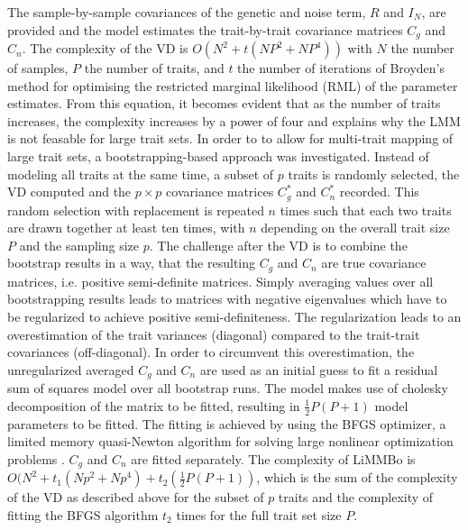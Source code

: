 The sample-by-sample covariances of the genetic and noise term, \(R\) and \(I_N\), are provided and the model estimates the trait-by-trait covariance matrices \(C_g\) and \(C_n\). The complexity of the VD is \(O(N^2 + t(NP^2 + NP^4))\) with \(N\) the number of samples, \(P\) the number of traits, and \(t\) the number of iterations of Broyden's method for optimising the restricted marginal likelihood (RML) of the parameter estimates. From this equation, it becomes evident that as the number of traits increases, the complexity increases by a power of four and explains why the LMM is not feasable for large trait sets. In order to to allow for multi-trait mapping of large trait sets, a bootstrapping-based approach was investigated. Instead of modeling all traits at the same time, a subset of \(p\) traits is randomly selected, the VD computed  and the $p \times p$ covariance matrices $C^*_g$ and $C^*_n$ recorded. This random selection with replacement is repeated \(n\) times such that each two traits are drawn together at least ten times, with \(n\) depending on the overall trait size \(P\) and the sampling size \(p\).  The challenge after the VD is to combine the bootstrap results in a way, that the resulting $C_g$ and $C_n$ are true covariance matrices, i.e. positive semi-definite matrices. Simply averaging values over all bootstrapping results leads to matrices with negative eigenvalues which have to be regularized to achieve positive semi-definiteness. The regularization leads to an overestimation of the trait variances (diagonal) compared to the trait-trait covariances (off-diagonal). In order to circumvent this overestimation, the unregularized averaged $C_g$ and $C_n$ are used as an initial guess to fit a residual sum of squares model over all bootstrap runs. The model makes use of cholesky decomposition of the matrix to be fitted, resulting in $\frac{1}{2}P(P+1)$ model parameters to be fitted. The fitting is achieved by using the BFGS optimizer, a limited memory quasi-Newton algorithm for solving large nonlinear optimization problems \citep{Byrd1995}.  $C_g$ and $C_n$ are fitted separately. The complexity of LiMMBo is \(O(N^2 + t_1(Np^2 + Np^4) + t_2(\frac{1}{2}P(P+1))\), which is the sum of the complexity of the VD as described above for the subset of \(p\) traits and the complexity of fitting the BFGS algorithm \(t_2\) times for the full trait set size \(P\). 


 
